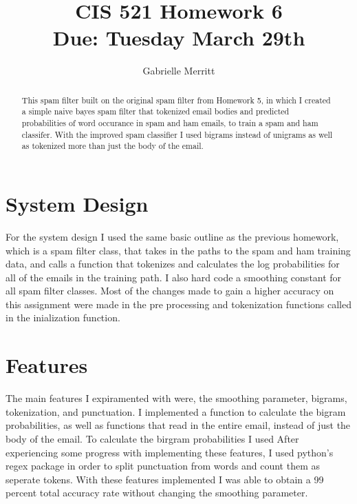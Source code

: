 \documentclass[11pt,english]{article}
\title{CIS 521 Homework 6 \\
Due:  Tuesday March 29th}
\author{Gabrielle Merritt}
\date{}
\begin{document}
\maketitle
\begin{abstract}
This spam filter built on the original spam filter from Homework 5, in which I created a simple naive bayes spam filter that tokenized email bodies and predicted probabilities of word occurance in spam and ham emails, to train a spam and ham classifer. With the improved spam classifier I used bigrams instead of unigrams as well as  tokenized more than just the body of the email.
\end{abstract}
\section*{System Design} 

For the system design I used the same basic outline as the previous homework, which is a spam filter class, that takes in the paths to the spam and ham training data, and calls a function that tokenizes and calculates the log probabilities for all of the emails in the training path. I also hard code a smoothing constant for all spam filter classes. Most of the changes made to gain a higher accuracy on this assignment were made in the pre processing and tokenization functions called in the inialization function. 
\section*{Features}
The main features I expiramented with were, the smoothing parameter, bigrams, tokenization, and punctuation. 
I implemented a function to calculate the bigram probabilities, as well as functions that read in the entire email, instead of just the body of the email.
To calculate the birgram probabilities I used 
After experiencing some progress with implementing these features, I used python's regex package in order to split punctuation from words and count them as seperate tokens. With these features implemented I was able to obtain a 99 percent total accuracy rate without changing the smoothing parameter. 
\end{document}
